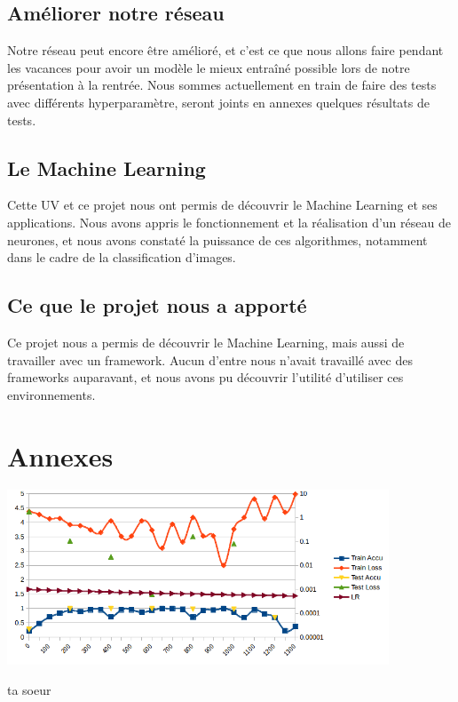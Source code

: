 \documentclass[a4paper,12pt]{article}
\begin{document}
  \subsection*{Améliorer notre réseau}
    Notre réseau peut encore être amélioré, et c'est ce que nous allons faire pendant les vacances pour avoir un modèle le mieux entraîné possible lors de notre présentation à la rentrée. Nous sommes actuellement en train de faire des tests avec différents hyperparamètre, seront joints en annexes quelques résultats de tests.
  
  \subsection*{Le Machine Learning}
    Cette UV et ce projet nous ont permis de découvrir le Machine Learning et ses applications. Nous avons appris le fonctionnement et la réalisation d'un réseau de neurones, et nous avons constaté la puissance de ces algorithmes, notamment dans le cadre de la classification d'images.
  
  \subsection*{Ce que le projet nous a apporté}
    Ce projet nous a permis de découvrir le Machine Learning, mais aussi de travailler avec un framework. Aucun d'entre nous n'avait travaillé avec des frameworks auparavant, et nous avons pu découvrir l'utilité d'utiliser ces environnements.

\newpage
\section*{Annexes}
\includegraphics[keepaspectratio=true,width=430]{graphs/graph1.png}
    \caption{ta soeur}
\end{document}
